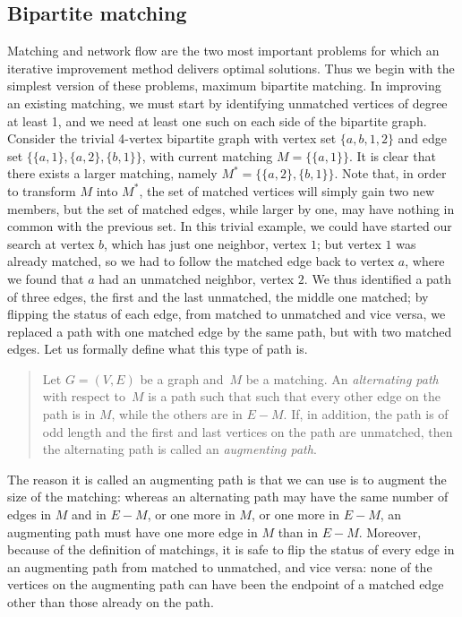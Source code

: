 \documentclass[11pt]{article}
\begin{document}
\subsection{Bipartite matching}
Matching and network flow are the two most important problems for which
an iterative improvement method delivers optimal solutions.   Thus we
begin with the simplest version of these problems, maximum bipartite matching.
In improving an existing matching, we must start by identifying unmatched
vertices of degree at least 1, and we need at least one such on each side
of the bipartite graph.  Consider the trivial 4-vertex bipartite graph
with vertex set $\{a,b,1,2\}$ and edge set $\{\{a,1\},\{a,2\},\{b,1\}\}$,
with current matching $M=\{\{a,1\}\}$.  It is clear that there exists
a larger matching, namely $M^{\ast}=\{\{a,2\},\{b,1\}\}$.  Note that,
in order to transform $M$ into $M^{\ast}$, the set of matched vertices
will simply gain two new members, but the set of matched edges, while
larger by one, may have nothing in common with the previous set.
In this trivial example, we could have started our search at vertex $b$,
which has just one neighbor, vertex $1$; but vertex $1$ was already matched,
so we had to follow the matched edge back to vertex $a$, where we found
that $a$ had an unmatched neighbor, vertex $2$.  We thus identified a path
of three edges, the first and the last unmatched, the middle one matched;
by flipping the status of each edge, from matched to unmatched and vice
versa, we replaced a path with one matched edge by the same path, but with
two matched edges.  Let us formally define what this type of path is.
\begin{quote}
  Let $G=(V,E)$ be a graph and~$M$ be a matching.  An
  \emph{alternating path} with respect to~$M$ is a path such that
  such that every other edge on the path is in $M$, while the others
  are in $E-M$.  If, in addition, the path is of odd length and the
  first and last vertices on the path are unmatched, then the alternating
  path is called an \emph{augmenting path}.
\end{quote}
The reason it is called an augmenting path is that we can use is to augment
the size of the matching: whereas an alternating path may have the same
number of edges in $M$ and in $E-M$, or one more in $M$, or one more in $E-M$,
an augmenting path must have one more edge in $M$ than in $E-M$.  Moreover,
because of the definition of matchings, it is safe to flip the status of every
edge in an augmenting path from matched to unmatched, and vice versa: none of
the vertices on the augmenting path can have been the endpoint of a matched
edge other than those already on the path.
\end{document}
